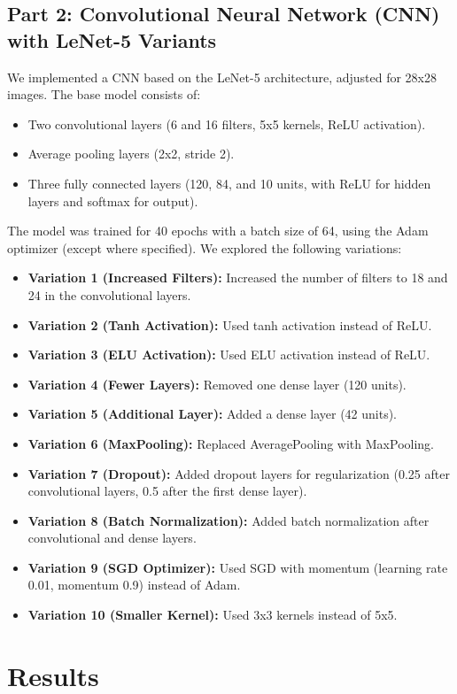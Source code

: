 \documentclass[a4paper,12pt]{article}
\begin{document}
\subsection{Part 2: Convolutional Neural Network (CNN) with LeNet-5 Variants}
We implemented a CNN based on the LeNet-5 architecture, adjusted for 28x28 images. The base model consists of:
\begin{itemize}
    \item Two convolutional layers (6 and 16 filters, 5x5 kernels, ReLU activation).
    \item Average pooling layers (2x2, stride 2).
    \item Three fully connected layers (120, 84, and 10 units, with ReLU for hidden layers and softmax for output).
\end{itemize}
The model was trained for 40 epochs with a batch size of 64, using the Adam optimizer (except where specified). We explored the following variations:
\begin{itemize}
    \item \textbf{Variation 1 (Increased Filters):} Increased the number of filters to 18 and 24 in the convolutional layers.
    \item \textbf{Variation 2 (Tanh Activation):} Used tanh activation instead of ReLU.
    \item \textbf{Variation 3 (ELU Activation):} Used ELU activation instead of ReLU.
    \item \textbf{Variation 4 (Fewer Layers):} Removed one dense layer (120 units).
    \item \textbf{Variation 5 (Additional Layer):} Added a dense layer (42 units).
    \item \textbf{Variation 6 (MaxPooling):} Replaced AveragePooling with MaxPooling.
    \item \textbf{Variation 7 (Dropout):} Added dropout layers for regularization (0.25 after convolutional layers, 0.5 after the first dense layer).
    \item \textbf{Variation 8 (Batch Normalization):} Added batch normalization after convolutional and dense layers.
    \item \textbf{Variation 9 (SGD Optimizer):} Used SGD with momentum (learning rate 0.01, momentum 0.9) instead of Adam.
    \item \textbf{Variation 10 (Smaller Kernel):} Used 3x3 kernels instead of 5x5.
\end{itemize}

\section{Results}
\end{document}
